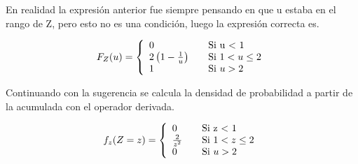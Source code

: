 		En realidad la expresión anterior fue siempre pensando en que u estaba en el rango de Z, pero esto no es una condición, luego la expresión correcta es.

		\begin{equation}
			F_Z(u) = \left\{
			  \begin{array}{l l}
			    0 & \quad \text{Si u $<$ 1}\\
			    2\left(1-\frac{1}{u}\right) & \quad \text{Si $1<u\leq2$}\\
			    1 & \quad \text{Si $u>2$}
			  \end{array} \right.
		\end{equation}

		Continuando con la sugerencia se calcula la densidad de probabilidad a partir de la acumulada con el operador derivada.

		\begin{equation}
			f_z(Z=z) = \left\{
			  \begin{array}{l l}
			    0 & \quad \text{Si z $<$ 1}\\
			    \frac{2}{z^2} & \quad \text{Si $1<z\leq2$}\\
			    0 & \quad \text{Si $u>2$}
			  \end{array} \right.
		\end{equation}